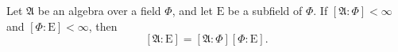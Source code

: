 Let $\mathfrak{A}$ be an algebra over a field $\Phi$, and let $\mathrm{E}$ be a subfield of $\Phi$. If $[\mathfrak{A} : \Phi] < \infty$ and $[\Phi : \mathrm{E}] < \infty$, then
$$[\mathfrak{A} : \mathrm{E}] = [\mathfrak{A} : \Phi][\Phi : \mathrm{E}].$$
